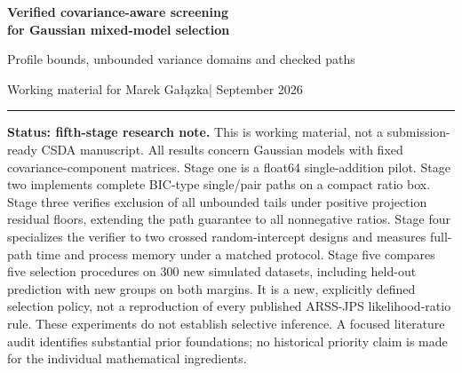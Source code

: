 \documentclass[11pt,a4paper]{article}
\theoremstyle{remark}\newtheorem{remark}[theorem]{Remark}
\begin{document}
\begin{center}
{\Large\bfseries\color{navy}Verified covariance-aware screening\\for Gaussian mixed-model selection}\par\vspace{5pt}
{\large Profile bounds, unbounded variance domains and checked paths}\par\vspace{9pt}
Working material for Marek Ga\l{}\k{a}zka\quad | September 2026
\end{center}
\vspace{-4pt}\noindent\textcolor{teal}{\rule{\linewidth}{1.2pt}}

\textbf{Status: fifth-stage research note.} This is working material, not a
submission-ready CSDA manuscript. All results concern Gaussian models with fixed
covariance-component matrices. Stage one is a float64 single-addition pilot.
Stage two implements complete BIC-type single/pair paths on a compact ratio box.
Stage three verifies exclusion of all unbounded tails under positive projection
residual floors, extending the path guarantee to all nonnegative ratios.
Stage four specializes the verifier to two crossed random-intercept designs
and measures full-path time and process memory under a matched protocol.
Stage five compares five selection procedures on 300 new simulated datasets,
including held-out prediction with new groups on both margins. It is
a new, explicitly defined selection policy, not a reproduction of every published
ARSS-JPS likelihood-ratio rule. These experiments do not establish selective inference.
A focused literature audit identifies substantial prior foundations; no historical
priority claim is made for the individual mathematical ingredients.
\end{document}
